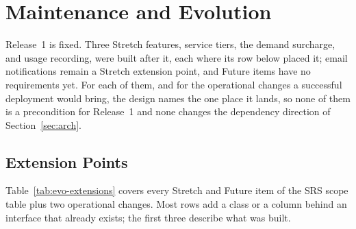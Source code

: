 \section{Maintenance and Evolution}\label{sec:evo}

Release~1 is fixed. Three Stretch features, service tiers, the demand surcharge, and usage recording, were built after it, each where its row below placed it; email notifications remain a Stretch extension point, and Future items have no requirements yet. For each of them, and for the operational changes a successful deployment would bring, the design names the one place it lands, so none of them is a precondition for Release~1 and none changes the dependency direction of Section~\ref{sec:arch}.

\subsection{Extension Points}

Table~\ref{tab:evo-extensions} covers every Stretch and Future item of the SRS scope table plus two operational changes. Most rows add a class or a column behind an interface that already exists; the first three describe what was built.

